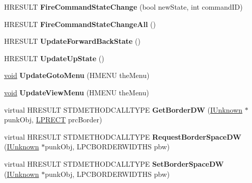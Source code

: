 \begin{DoxyCompactItemize}
\mbox{\label{class_c_shell_browser_afcbe80f397b7e61e9b3c7aab09af6453}} 
H\+R\+E\+S\+U\+LT {\bfseries Fire\+Command\+State\+Change} (bool new\+State, int command\+ID)
\item 
\mbox{\label{class_c_shell_browser_adc786341fc41c1e666abea7ffbcf27c4}} 
H\+R\+E\+S\+U\+LT {\bfseries Fire\+Command\+State\+Change\+All} ()
\item 
\mbox{\label{class_c_shell_browser_aa964acdcc42d8358a80adacacae50dc8}} 
H\+R\+E\+S\+U\+LT {\bfseries Update\+Forward\+Back\+State} ()
\item 
\mbox{\label{class_c_shell_browser_a1d42fabe14a7fbaeeb8dacce0492dabb}} 
H\+R\+E\+S\+U\+LT {\bfseries Update\+Up\+State} ()
\item 
\mbox{\label{class_c_shell_browser_a7f5f8253ead4cd31a2d68ee2f7e14a44}} 
\hyperlink{interfacevoid}{void} {\bfseries Update\+Goto\+Menu} (H\+M\+E\+NU the\+Menu)
\item 
\mbox{\label{class_c_shell_browser_a71da592748ee4a634a1c6109b56369bd}} 
\hyperlink{interfacevoid}{void} {\bfseries Update\+View\+Menu} (H\+M\+E\+NU the\+Menu)
\item 
\mbox{\label{class_c_shell_browser_a24219b4c2e82ed19ac44cd047bf28432}} 
virtual H\+R\+E\+S\+U\+LT S\+T\+D\+M\+E\+T\+H\+O\+D\+C\+A\+L\+L\+T\+Y\+PE {\bfseries Get\+Border\+DW} (\hyperlink{interface_i_unknown}{I\+Unknown} $\ast$punk\+Obj, \hyperlink{structtag_r_e_c_t}{L\+P\+R\+E\+CT} prc\+Border)
\item 
\mbox{\label{class_c_shell_browser_a6df98a266c8e602e353aac9cf1466843}} 
virtual H\+R\+E\+S\+U\+LT S\+T\+D\+M\+E\+T\+H\+O\+D\+C\+A\+L\+L\+T\+Y\+PE {\bfseries Request\+Border\+Space\+DW} (\hyperlink{interface_i_unknown}{I\+Unknown} $\ast$punk\+Obj, L\+P\+C\+B\+O\+R\+D\+E\+R\+W\+I\+D\+T\+HS pbw)
\item 
\mbox{\label{class_c_shell_browser_a32eeed5e977394e57887a268ab77f968}} 
virtual H\+R\+E\+S\+U\+LT S\+T\+D\+M\+E\+T\+H\+O\+D\+C\+A\+L\+L\+T\+Y\+PE {\bfseries Set\+Border\+Space\+DW} (\hyperlink{interface_i_unknown}{I\+Unknown} $\ast$punk\+Obj, L\+P\+C\+B\+O\+R\+D\+E\+R\+W\+I\+D\+T\+HS pbw)

\end{DoxyCompactItemize}
